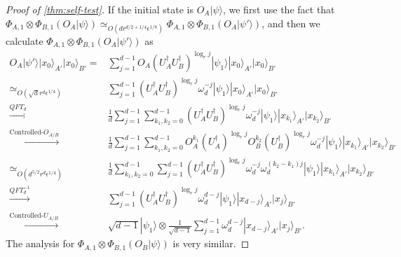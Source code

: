 \documentclass[11pt,letterpaper]{article}
\newcommand{\ket}[1]{|#1\rangle}
\newcommand{\x}{\otimes}
\newcommand{\ct}{^{\dagger}}
\newcommand{\1}{\mathbb{1}}
\newcommand{\ep}{\epsilon}
\newcommand{\sd}{\sqrt{d}}
\newcommand{\appd}[1]{\simeq_{#1}}
\theoremstyle{definition}
\begin{document}
\begin{proof}[Proof of \cref{thm:self-test}]
If the initial state is $O_A\ket{\psi}$, we first use the fact that 
$ \Phi_{A,1} \x \Phi_{B,1} (O_A\ket{\psi}) \appd{O(d r^{d/2+1/4} \ep^{1/8})}  \Phi_{A,1} \x \Phi_{B,1} (O_A\ket{\psi'})$, 
and then we calculate $\Phi_{A,1} \x \Phi_{B,1} (O_A\ket{\psi'})$ as
\begin{align*}
	O_A \ket{\psi'} \ket{x_0}_{A'}\ket{x_0}_{B'} =&  
		\sum_{j=1}^{d-1} O_A(U_A\ct U_B\ct)^{\log_r j}\ket{\psi_1}\ket{x_0}_{A'}\ket{x_0}_{B'}\\
		\appd{O(\sd r^d \ep^{1/4})}&\sum_{j=1}^{d-1}(U_A\ct U_B\ct)^{\log_r j} \omega_d^{-j} \ket{\psi_1} \ket{x_0}_{A'}\ket{x_0}_{B'}\\
		\xrightarrow[]{QFT_d} &\frac{1}{d}\sum_{j=1}^{d-1} \sum_{k_1,k_2 = 0}^{d-1}(U_A\ct U_B\ct)^{\log_r j} \omega_d^{-j} 
		\ket{\psi_1}\ket{x_{k_1}}_{A'}\ket{x_{k_2}}_{B'}\\
		\xrightarrow[]{\text{Controlled-}O_{A/B}}&\frac{1}{d}\sum_{j=1}^{d-1}\sum_{k_1,k_2 = 0}^{d-1} 
		 O_A^{k_1}(U_A\ct)^{\log_r j} O_B^{k_2}(U_B\ct)^{\log_r j} \omega_d^{-j} \ket{\psi_1} 
		 \ket{x_{k_1}}_{A'}\ket{x_{k_2}}_{B'}\\
		\appd{O(d^{5/2} r^{d}  \ep^{1/4})}& \frac{1}{d}\sum_{k_1,k_2 = 0}^{d-1} \sum_{j=1}^{d-1} (U_A\ct U_B\ct)^{\log_r j}
		\omega_d^{-j}\omega_d^{(k_2-k_1)j}\ket{\psi_1}
		 \ket{x_{k_1}}_{A'}\ket{x_{k_2}}_{B'}\\
		\xrightarrow[]{QFT_d^{-1}}& \sum_{j=1}^{d-1}  (U_A\ct U_B\ct)^{\log_r j}  
		\omega_d^{d-j}\ket{\psi_1} \ket{x_{d-j}}_{A'}\ket{x_j}_{B'}\\
		\xrightarrow[]{\text{Controlled-}U_{A/B}}&   \sqrt{d-1} \ket{\psi_1} \x  
		\frac{1}{\sqrt{d-1}}\sum_{j=1}^{d-1} \omega_d^{d-j}\ket{x_{d-j}}_{A'}\ket{x_j}_{B'}.
\end{align*}
The analysis for $\Phi_{A,1} \x\Phi_{B,1} (O_B \ket{\psi})$ is very similar.


\end{proof}
\end{document}
